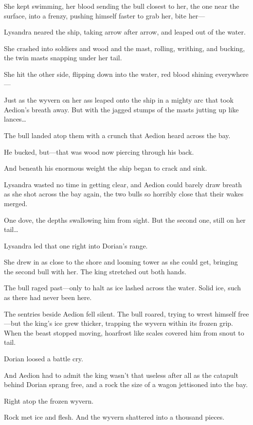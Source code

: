 She kept swimming, her blood sending the bull closest to her, the one near the surface, into a frenzy, pushing himself faster to grab her, bite her---

Lysandra neared the ship, taking arrow after arrow, and leaped out of the water.

She crashed into soldiers and wood and the mast, rolling, writhing, and bucking, the twin masts snapping under her tail.

She hit the other side, flipping down into the water, red blood shining everywhere---

Just as the wyvern on her ass leaped onto the ship in a mighty arc that took Aedion's breath away. But with the jagged stumps of the masts jutting up like lances\ldots{}

The bull landed atop them with a crunch that Aedion heard across the bay.

He bucked, but---that was wood now piercing through his back.

And beneath his enormous weight  the ship began to crack and sink.

Lysandra wasted no time in getting clear, and Aedion could barely draw breath as she shot across the bay again, the two bulls so horribly close that their wakes merged.

One dove, the depths swallowing him from sight. But the second one, still on her tail\ldots{}

Lysandra led that one right into Dorian's range.

She drew in as close to the shore and looming tower as she could get, bringing the second bull with her. The king stretched out both hands.

The bull raged past---only to halt as ice lashed across the water. Solid ice, such as there had never been here.

The sentries beside Aedion fell silent. The bull roared, trying to wrest himself free---but the king's ice grew thicker, trapping the wyvern within its frozen grip. When the beast stopped moving, hoarfrost like scales covered him from snout to tail.

Dorian loosed a battle cry.

And Aedion had to admit the king wasn't that useless after all as the catapult behind Dorian sprang free, and a rock the size of a wagon jettisoned into the bay.

Right atop the frozen wyvern.

Rock met ice and flesh. And the wyvern shattered into a thousand pieces.

